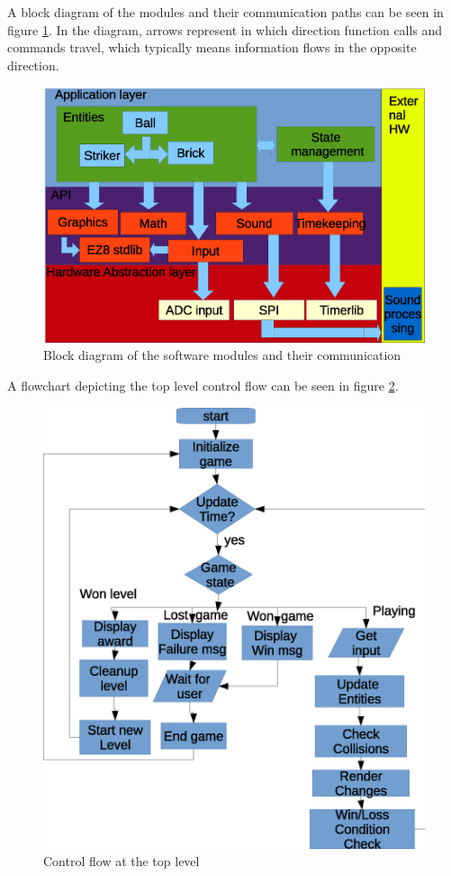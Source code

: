 A block diagram of the modules and their communication paths can be seen in figure \ref{architecture_block}. In the
diagram, arrows represent in which direction function calls and commands travel, which typically means information
flows in the opposite direction.

\begin{figure}
	\center
	\includegraphics[scale=0.7]{pictures/architecture_block.eps}
	\caption{Block diagram of the software modules and their communication}
	\label{architecture_block}
\end{figure}

A flowchart depicting the top level control flow can be seen in figure \ref{top_flow}.

\begin{figure}
	\center
	\includegraphics[scale=0.7]{pictures/top_flow.eps}
	\caption{Control flow at the top level}
	\label{top_flow}
\end{figure}
